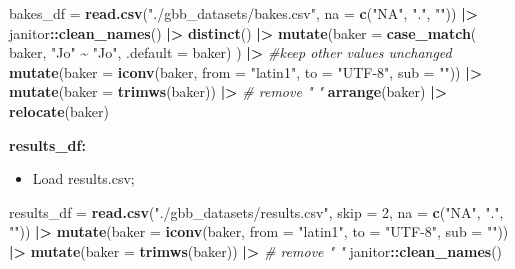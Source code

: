 \documentclass[
]{article}
\newenvironment{Shaded}{\begin{snugshade}}{\end{snugshade}}
\newcommand{\AttributeTok}[1]{\textcolor[rgb]{0.13,0.29,0.53}{#1}}
\newcommand{\CommentTok}[1]{\textcolor[rgb]{0.56,0.35,0.01}{\textit{#1}}}
\newcommand{\DecValTok}[1]{\textcolor[rgb]{0.00,0.00,0.81}{#1}}
\newcommand{\FunctionTok}[1]{\textcolor[rgb]{0.13,0.29,0.53}{\textbf{#1}}}
\newcommand{\NormalTok}[1]{#1}
\newcommand{\OtherTok}[1]{\textcolor[rgb]{0.56,0.35,0.01}{#1}}
\newcommand{\SpecialCharTok}[1]{\textcolor[rgb]{0.81,0.36,0.00}{\textbf{#1}}}
\newcommand{\StringTok}[1]{\textcolor[rgb]{0.31,0.60,0.02}{#1}}
\providecommand{\tightlist}{%
  \setlength{\itemsep}{0pt}\setlength{\parskip}{0pt}}
\begin{document}
\begin{Shaded}
\begin{Highlighting}[]
\NormalTok{bakes\_df }\OtherTok{=} \FunctionTok{read.csv}\NormalTok{(}\StringTok{"./gbb\_datasets/bakes.csv"}\NormalTok{, }
                     \AttributeTok{na =} \FunctionTok{c}\NormalTok{(}\StringTok{"NA"}\NormalTok{, }\StringTok{"."}\NormalTok{, }\StringTok{""}\NormalTok{)) }\SpecialCharTok{|\textgreater{}}
\NormalTok{  janitor}\SpecialCharTok{::}\FunctionTok{clean\_names}\NormalTok{() }\SpecialCharTok{|\textgreater{}}
  \FunctionTok{distinct}\NormalTok{() }\SpecialCharTok{|\textgreater{}}
  \FunctionTok{mutate}\NormalTok{(}\AttributeTok{baker =} \FunctionTok{case\_match}\NormalTok{(}
\NormalTok{    baker,}
    \StringTok{\textquotesingle{}"Jo"\textquotesingle{}} \SpecialCharTok{\textasciitilde{}} \StringTok{"Jo"}\NormalTok{,}
    \AttributeTok{.default =}\NormalTok{ baker)}
\NormalTok{    ) }\SpecialCharTok{|\textgreater{}} \CommentTok{\#keep other values unchanged}
  \FunctionTok{mutate}\NormalTok{(}\AttributeTok{baker =} \FunctionTok{iconv}\NormalTok{(baker, }\AttributeTok{from =} \StringTok{"latin1"}\NormalTok{, }\AttributeTok{to =} \StringTok{"UTF{-}8"}\NormalTok{, }\AttributeTok{sub =} \StringTok{""}\NormalTok{)) }\SpecialCharTok{|\textgreater{}}
  \FunctionTok{mutate}\NormalTok{(}\AttributeTok{baker =} \FunctionTok{trimws}\NormalTok{(baker)) }\SpecialCharTok{|\textgreater{}}  \CommentTok{\# remove " "}
  \FunctionTok{arrange}\NormalTok{(baker) }\SpecialCharTok{|\textgreater{}}
  \FunctionTok{relocate}\NormalTok{(baker)}
\end{Highlighting}
\end{Shaded}

\textbf{results\_df:}

\begin{itemize}
\tightlist
\item
  Load results.csv;
\end{itemize}

\begin{Shaded}
\begin{Highlighting}[]
\NormalTok{results\_df }\OtherTok{=} \FunctionTok{read.csv}\NormalTok{(}\StringTok{"./gbb\_datasets/results.csv"}\NormalTok{, }\AttributeTok{skip =} \DecValTok{2}\NormalTok{,}
                      \AttributeTok{na =} \FunctionTok{c}\NormalTok{(}\StringTok{"NA"}\NormalTok{, }\StringTok{"."}\NormalTok{, }\StringTok{""}\NormalTok{)) }\SpecialCharTok{|\textgreater{}}
  \FunctionTok{mutate}\NormalTok{(}\AttributeTok{baker =} \FunctionTok{iconv}\NormalTok{(baker, }\AttributeTok{from =} \StringTok{"latin1"}\NormalTok{, }\AttributeTok{to =} \StringTok{"UTF{-}8"}\NormalTok{, }\AttributeTok{sub =} \StringTok{""}\NormalTok{)) }\SpecialCharTok{|\textgreater{}}
  \FunctionTok{mutate}\NormalTok{(}\AttributeTok{baker =} \FunctionTok{trimws}\NormalTok{(baker)) }\SpecialCharTok{|\textgreater{}}  \CommentTok{\# remove " "}
\NormalTok{  janitor}\SpecialCharTok{::}\FunctionTok{clean\_names}\NormalTok{() }
\end{Highlighting}
\end{Shaded}
\end{document}
